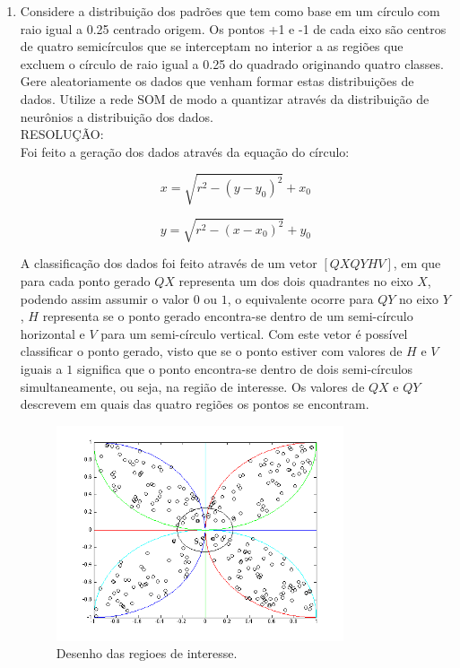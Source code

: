 \documentclass[a4paper,oneside,12pt]{article}
\begin{document}
\begin{enumerate}[1.]
Foram implementados o algoritmo competitivo e o algoritmo SOM, como segue abaixo:





\item Considere a distribui\c{c}\~ao dos padr\~oes que tem como base em um c\'irculo com raio igual a 0.25 centrado origem. Os pontos +1 e -1 de cada eixo s\~ao centros de quatro semic\'irculos que se interceptam no interior a as regi\~oes que excluem o c\'irculo de raio igual a 0.25 do quadrado originando quatro classes. Gere aleatoriamente os dados que venham formar estas distribui\c{c}\~oes de dados. Utilize a rede SOM de modo a quantizar atrav\'es da distribui\c{c}\~ao de neur\^onios a distribui\c{c}\~ao dos dados. \\

RESOLU\c{C}\~AO: \\

Foi feito a gera\c{c}\~ao dos dados atrav\'es da equa\c{c}\~ao do c\'irculo:

\begin{equation*}
x = \sqrt{r^{2} - (y - y_{0})^{2}} + x_{0}
\end{equation*}

\begin{equation*}
y = \sqrt{r^{2} - (x - x_{0})^{2}} + y_{0}
\end{equation*}

A classifica\c{c}\~ao dos dados foi feito atrav\'es de um vetor $[QX QY H V]$, em que para cada ponto gerado $QX$ representa um dos dois quadrantes no eixo $X$, podendo assim assumir o valor $0$ ou $1$, o equivalente ocorre para $QY$ no eixo $Y$, $H$ representa se o ponto gerado encontra-se dentro de um semi-c\'irculo horizontal e $V$ para um semi-c\'irculo vertical. Com este vetor \'e poss\'ivel classificar o ponto gerado, visto que se o ponto estiver com valores de $H$ e $V$ iguais a $1$ significa que o ponto encontra-se dentro de dois semi-c\'irculos simultaneamente, ou seja, na regi\~ao de interesse. Os valores de $QX$ e $QY$ descrevem em quais das quatro regi\~oes os pontos se encontram.

\begin{figure}
\centering
\includegraphics[width=0.8\textwidth]{q8_1.png}
\caption{Desenho das regioes de interesse.}
\label{fig:q8_1}
\end{figure}


\end{enumerate}
\end{document}
